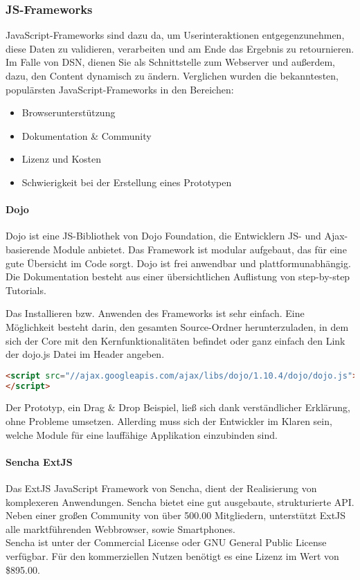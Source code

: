 \subsubsection{JS-Frameworks}
JavaScript-Frameworks sind dazu da, um Userinteraktionen entgegenzunehmen, diese Daten zu validieren, verarbeiten und am Ende das Ergebnis zu retournieren.\\
Im Falle von DSN, dienen Sie als Schnittstelle zum Webserver und außerdem, dazu, den Content dynamisch zu ändern. Verglichen wurden die bekanntesten, populärsten JavaScript-Frameworks in den Bereichen:
\begin{itemize}
\item Browserunterstützung
\item Dokumentation \& Community
\item Lizenz und Kosten
\item Schwierigkeit bei der Erstellung eines Prototypen
\end{itemize}
\paragraph{Dojo}
Dojo ist eine JS-Bibliothek von Dojo Foundation, die Entwicklern JS- und Ajax-basierende Module anbietet. Das Framework ist modular aufgebaut, das für eine gute Übersicht im Code sorgt. Dojo ist frei anwendbar und plattformunabhängig. Die Dokumentation besteht aus einer übersichtlichen Auflistung von step-by-step Tutorials. \cite{DOJO}

Das Installieren bzw. Anwenden des Frameworks ist sehr einfach. Eine Möglichkeit besteht darin, den gesamten Source-Ordner herunterzuladen, in dem sich der Core mit den Kernfunktionalitäten befindet oder ganz einfach den Link der dojo.js Datei im Header angeben.
\begin{lstlisting}[caption={Dojo einbinden\cite{DOJODOWN}}, language=HTML]
<script src="//ajax.googleapis.com/ajax/libs/dojo/1.10.4/dojo/dojo.js">
</script>
\end{lstlisting}

Der Prototyp, ein Drag \& Drop Beispiel, ließ sich dank verständlicher Erklärung, ohne Probleme umsetzen. Allerding muss sich der Entwickler im Klaren sein, welche Module für eine lauffähige Applikation einzubinden sind. \cite{DOJOINFO}

\paragraph{Sencha ExtJS}
Das ExtJS JavaScript Framework von Sencha, dient der Realisierung von komplexeren Anwendungen. Sencha bietet eine gut ausgebaute, strukturierte API. Neben einer großen Community von über 500.00 Mitgliedern, unterstützt ExtJS alle marktführenden Webbrowser, sowie Smartphones.\\
Sencha ist unter der Commercial License oder GNU General Public License verfügbar. Für den kommerziellen Nutzen benötigt es eine Lizenz im Wert von \$895.00.\cite{SENCHA}

